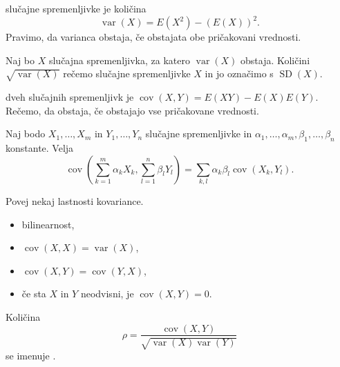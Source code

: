 \begin{definicija}
   slučajne spremenljivke je količina
  \[
	\operatorname{var}(X) = E(X^2) - (E(X))^2.
  \]
  Pravimo, da varianca obstaja, če obstajata obe pričakovani vrednosti.
\end{definicija}

\begin{definicija}
  Naj bo $X$ slučajna spremenljivka, za katero $\operatorname{var}(X)$ obstaja.
  Količini $\sqrt{\operatorname{var}(X)}$ rečemo 
  slučajne spremenljivke $X$ in jo označimo s $\operatorname{SD}(X)$.
\end{definicija}

\begin{definicija}
   dveh slučajnih spremenljivk je $\operatorname{cov}(X, Y) =
  E(XY) - E(X) E(Y)$.
  Rečemo, da obstaja, če obstajajo vse pričakovane vrednosti.
\end{definicija}


\begin{izrek}
  Naj bodo $X_1, \ldots, X_m$ in $Y_1, \ldots, Y_n$ slučajne spremenljivke in
  $\alpha_1, \ldots, \alpha_m, \beta_1, \ldots, \beta_n$ konstante.
  Velja
  \[
	\operatorname{cov}\!\left( \sum_{k=1}^m \alpha_k X_k, \sum_{l=1}^n \beta_l
	  Y_l \right)
	= \sum_{k,l} \alpha_k \beta_l \operatorname{cov}(X_k, Y_l).
  \]
\end{izrek}

\begin{vo}{Povej nekaj lastnosti kovariance.}
  \begin{itemize}
  \item bilinearnost,
  \item $\operatorname{cov}(X,X) = \operatorname{var}(X)$,
  \item $\operatorname{cov}(X,Y) = \operatorname{cov}(Y,X)$,
  \item če sta $X$ in $Y$ neodvisni, je $\operatorname{cov}(X,Y) = 0$.
  \end{itemize}
\end{vo}

\begin{definicija}
  Količina
  \[
	\rho = \frac{\operatorname{cov}(X,Y)}{\sqrt{\operatorname{var}(X)
		\operatorname{var}(Y)}}
  \]
  se imenuje .
\end{definicija}

